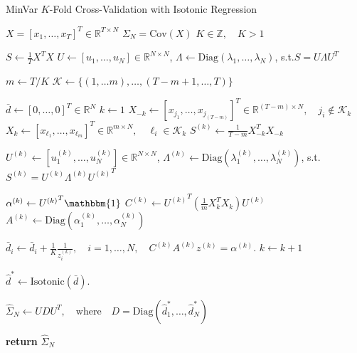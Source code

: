 \documentclass{article}
\begin{document}
\begin{algorithm}
	\caption{MinVar $K$-Fold Cross-Validation with Isotonic Regression}
	\label{alg:minvar_kfold_cv}
	\begin{algorithmic}[1]
	\Require $X = [x_1, \ldots, x_T]^T \in \mathbb{R}^{T\times N}$
	\Require $\Sigma_N = \mathrm{Cov}(X)$
	\Require $K \in \mathbb{Z}, \quad K > 1$

		\State $S \gets \frac1T X^T X$
		\State 
				$U \gets [u_1, \ldots, u_N] \in \mathbb{R}^{N\times N}$,
				\quad $\Lambda \gets \mathrm{Diag}(\lambda_1, \ldots, \lambda_N)$,
				\quad \mbox{s.t.}\quad $S = U \Lambda {U}^T$

		\State $m \gets T / K$
		\State $\mathcal{K} \gets \{(1, \ldots m), \ldots, (T-m+1, \ldots, T)\}$

		\State $\bar{d} \gets [0, \ldots, 0]^T \in \mathbb{R}^{N}$
		\State $k \gets 1$
			\State $X_{-k} \gets [x_{j_1}, \ldots, x_{j_{(T-m)}}]^T \in \mathbb{R}^{(T-m)\times N}, 
				\quad j_i \notin \mathcal{K}_k$
			\State $X_{k} \gets [x_{\ell_1}, \ldots, x_{\ell_m}]^T \in \mathbb{R}^{m\times N}, 
				\quad \ell_i \in \mathcal{K}_k$
			\State $S^{(k)} \gets \frac{1}{T-m} X_{-k}^T X_{-k} $

			\State 
				$U^{(k)} \gets [u^{(k)}_1, \ldots, u^{(k)}_N] \in \mathbb{R}^{N\times N}$,
				\quad $\Lambda^{(k)} 
					\gets \mathrm{Diag}(\lambda^{(k)}_1, \ldots, \lambda^{(k)}_N)$,
				\quad \mbox{s.t.}\quad $S^{(k)} = U^{(k)} \Lambda^{(k)} {U^{(k)}}^T$

			\State $\alpha^{(k)} \gets {U^{(k)}}^T\mathbbm{1}$
			\State $C^{(k)} \gets {U^{(k)}}^T (\frac1m X_{k}^T X_{k}) U^{(k)}$
			\State $A^{(k)} \gets \mathrm{Diag}(\alpha^{(k)}_1, \ldots, \alpha^{(k)}_N)$


			\State $\bar{d}_i \gets \bar{d}_i 
				+ \frac1K \frac{1}{z^{(k)}_i}, \quad i = 1, \ldots, N, 
					\quad C^{(k)} A^{(k)} z^{(k)} = \alpha^{(k)}.$
			\State $k \gets k+1$

		\EndWhile

		\State $\hat{d}^* \gets \mathrm{Isotonic}(\bar{d}).$ 

		\State $\hat{\Sigma}_N \gets UDU^T, \quad 
			\mbox{where}\quad D = \mathrm{Diag}(\hat{d}^*_1, \ldots, \hat{d}^*_N)$

		\State \textbf{return} $\hat{\Sigma}_N$ 
	\EndProcedure
	\end{algorithmic}
\end{algorithm}
\end{document}
